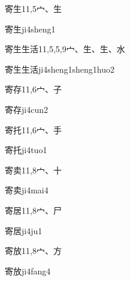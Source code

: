\begin{entry}{寄生}{11,5}{⼧、⽣}
  \begin{phonetics}{寄生}{ji4sheng1}
  \end{phonetics}
\end{entry}

\begin{entry}{寄生生活}{11,5,5,9}{⼧、⽣、⽣、⽔}
  \begin{phonetics}{寄生生活}{ji4sheng1sheng1huo2}
  \end{phonetics}
\end{entry}

\begin{entry}{寄存}{11,6}{⼧、⼦}
  \begin{phonetics}{寄存}{ji4cun2}
  \end{phonetics}
\end{entry}

\begin{entry}{寄托}{11,6}{⼧、⼿}
  \begin{phonetics}{寄托}{ji4tuo1}
  \end{phonetics}
\end{entry}

\begin{entry}{寄卖}{11,8}{⼧、⼗}
  \begin{phonetics}{寄卖}{ji4mai4}
  \end{phonetics}
\end{entry}

\begin{entry}{寄居}{11,8}{⼧、⼫}
  \begin{phonetics}{寄居}{ji4ju1}
  \end{phonetics}
\end{entry}

\begin{entry}{寄放}{11,8}{⼧、⽅}
  \begin{phonetics}{寄放}{ji4fang4}
  \end{phonetics}
\end{entry}

